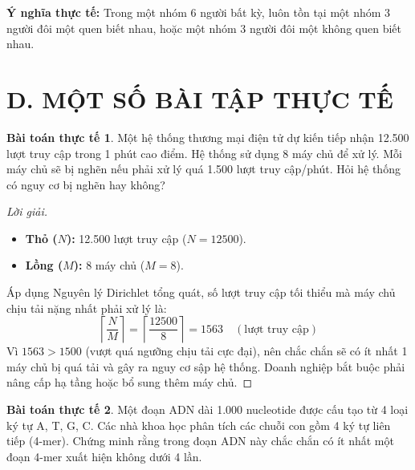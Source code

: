 \documentclass[12pt,a4paper]{article}
\theoremstyle{definition}
\newtheorem{example}{Bài toán thực tế}
\begin{document}
\noindent\textbf{Ý nghĩa thực tế:} Trong một nhóm 6 người bất kỳ, luôn tồn tại một nhóm 3 người đôi một quen biết nhau, hoặc một nhóm 3 người đôi một không quen biết nhau.

\newpage

\section*{D. MỘT SỐ BÀI TẬP THỰC TẾ}

\setcounter{example}{0}

\begin{example}
Một hệ thống thương mại điện tử dự kiến tiếp nhận 12.500 lượt truy cập trong 1 phút cao điểm. Hệ thống sử dụng 8 máy chủ để xử lý. Mỗi máy chủ sẽ bị nghẽn nếu phải xử lý quá 1.500 lượt truy cập/phút. Hỏi hệ thống có nguy cơ bị nghẽn hay không?
\end{example}

\begin{proof}[Lời giải]
\leavevmode
\begin{itemize}[leftmargin=1.5cm, itemsep=2pt, topsep=2pt]
    \item \textbf{Thỏ ($N$):} 12.500 lượt truy cập ($N = 12500$).
    \item \textbf{Lồng ($M$):} 8 máy chủ ($M = 8$).
\end{itemize}

\vspace{0.2cm}
\noindent Áp dụng Nguyên lý Dirichlet tổng quát, số lượt truy cập tối thiểu mà máy chủ chịu tải nặng nhất phải xử lý là:
\[
\left\lceil \frac{N}{M} \right\rceil = \left\lceil \frac{12500}{8} \right\rceil = 1563 \quad (\text{lượt truy cập})
\]
Vì $1563 > 1500$ (vượt quá ngưỡng chịu tải cực đại), nên chắc chắn sẽ có ít nhất 1 máy chủ bị quá tải và gây ra nguy cơ sập hệ thống. Doanh nghiệp bắt buộc phải nâng cấp hạ tầng hoặc bổ sung thêm máy chủ.
\end{proof}

\vspace{0.5cm}

\begin{example}
Một đoạn ADN dài 1.000 nucleotide được cấu tạo từ 4 loại ký tự A, T, G, C. Các nhà khoa học phân tích các chuỗi con gồm 4 ký tự liên tiếp (4-mer). Chứng minh rằng trong đoạn ADN này chắc chắn có ít nhất một đoạn 4-mer xuất hiện không dưới 4 lần.
\end{example}
\end{document}

